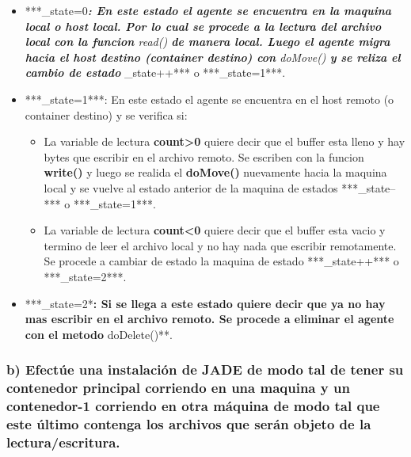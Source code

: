 \documentclass[11pt]{extarticle}
\providecommand{\tightlist}{%
      \setlength{\itemsep}{0pt}\setlength{\parskip}{0pt}}
\begin{document}
\begin{itemize}
  \begin{itemize}
  \item
    ***\_state=0\emph{\textbf{: En este estado el agente se encuentra en
    la maquina local o host local. Por lo cual se procede a la lectura
    del archivo local con la funcion }read()\textbf{ de manera local.
    Luego el agente migra hacia el host destino (container destino) con
    }doMove()\textbf{ y se reliza el cambio de estado }}\_state++*** o
    ***\_state=1***.
  \item
    ***\_state=1***: En este estado el agente se encuentra en el host
    remoto (o container destino) y se verifica si:

    \begin{itemize}
    \tightlist
    \item
      La variable de lectura \textbf{count\textgreater{}0} quiere decir
      que el buffer esta lleno y hay bytes que escribir en el archivo
      remoto. Se escriben con la funcion \textbf{write()} y luego se
      realida el \textbf{doMove()} nuevamente hacia la maquina local y
      se vuelve al estado anterior de la maquina de estados
      ***\_state--*** o ***\_state=1***.
    \item
      La variable de lectura \textbf{count\textless{}0} quiere decir que
      el buffer esta vacio y termino de leer el archivo local y no hay
      nada que escribir remotamente. Se procede a cambiar de estado la
      maquina de estado ***\_state++*** o ***\_state=2***.
    \end{itemize}
  \item
    ***\_state=2*\textbf{: Si se llega a este estado quiere decir que ya
    no hay mas escribir en el archivo remoto. Se procede a eliminar el
    agente con el metodo }doDelete()**.
  \end{itemize}
\end{itemize}

    \hypertarget{b-efectuxfae-una-instalaciuxf3n-de-jade-de-modo-tal-de-tener-su-contenedor-principal-corriendo-en-una-maquina-y-un-contenedor-1-corriendo-en-otra-muxe1quina-de-modo-tal-que-este-uxfaltimo-contenga-los-archivos-que-seruxe1n-objeto-de-la-lecturaescritura.}{%
\subsubsection{b) Efectúe una instalación de JADE de modo tal de tener
su contenedor principal corriendo en una maquina y un contenedor-1
corriendo en otra máquina de modo tal que este último contenga los
archivos que serán objeto de la
lectura/escritura.}\label{b-efectuxfae-una-instalaciuxf3n-de-jade-de-modo-tal-de-tener-su-contenedor-principal-corriendo-en-una-maquina-y-un-contenedor-1-corriendo-en-otra-muxe1quina-de-modo-tal-que-este-uxfaltimo-contenga-los-archivos-que-seruxe1n-objeto-de-la-lecturaescritura.}}
\end{document}
